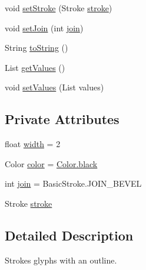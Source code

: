 \begin{DoxyCompactItemize}
\item 
void \mbox{\hyperlink{classorg_1_1newdawn_1_1slick_1_1font_1_1effects_1_1_outline_effect_aaea80188301a66f869e1a6e3d5cd5cf7}{set\+Stroke}} (Stroke \mbox{\hyperlink{classorg_1_1newdawn_1_1slick_1_1font_1_1effects_1_1_outline_effect_a4a9b2320afee8e246983b063c5cdafe9}{stroke}})
\item 
void \mbox{\hyperlink{classorg_1_1newdawn_1_1slick_1_1font_1_1effects_1_1_outline_effect_a7f5b6e68f1c83e5d9b8b1c271d1a8577}{set\+Join}} (int \mbox{\hyperlink{classorg_1_1newdawn_1_1slick_1_1font_1_1effects_1_1_outline_effect_a913a20571098d37c45f5aff95ff844f9}{join}})
\item 
String \mbox{\hyperlink{classorg_1_1newdawn_1_1slick_1_1font_1_1effects_1_1_outline_effect_af0c4f7e4ee8cf7282bf1521f8647185c}{to\+String}} ()
\item 
List \mbox{\hyperlink{classorg_1_1newdawn_1_1slick_1_1font_1_1effects_1_1_outline_effect_adbf0ba0c8ddcdc2a53c6a4e8c583fa33}{get\+Values}} ()
\item 
void \mbox{\hyperlink{classorg_1_1newdawn_1_1slick_1_1font_1_1effects_1_1_outline_effect_a02dbe78f6e87a036b850e35d3bbeb17c}{set\+Values}} (List values)
\end{DoxyCompactItemize}
\subsection*{Private Attributes}
\begin{DoxyCompactItemize}
\item 
float \mbox{\hyperlink{classorg_1_1newdawn_1_1slick_1_1font_1_1effects_1_1_outline_effect_aad96e33c4fb5804e7423df04e1cc1936}{width}} = 2
\item 
Color \mbox{\hyperlink{classorg_1_1newdawn_1_1slick_1_1font_1_1effects_1_1_outline_effect_a00160c4c005cb659d45c135a2798005f}{color}} = \mbox{\hyperlink{classorg_1_1newdawn_1_1slick_1_1_color_ac9ec721980ab1c388e82e2f8e584f002}{Color.\+black}}
\item 
int \mbox{\hyperlink{classorg_1_1newdawn_1_1slick_1_1font_1_1effects_1_1_outline_effect_a913a20571098d37c45f5aff95ff844f9}{join}} = Basic\+Stroke.\+J\+O\+I\+N\+\_\+\+B\+E\+V\+EL
\item 
Stroke \mbox{\hyperlink{classorg_1_1newdawn_1_1slick_1_1font_1_1effects_1_1_outline_effect_a4a9b2320afee8e246983b063c5cdafe9}{stroke}}
\end{DoxyCompactItemize}


\subsection{Detailed Description}
Strokes glyphs with an outline.

